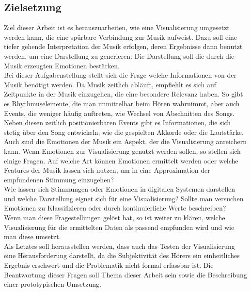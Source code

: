 \documentclass[11pt,a4paper]{article}
\begin{document}
\subsection{Zielsetzung}
Ziel dieser Arbeit ist es herauszuarbeiten, wie eine Visualisierung umgesetzt werden kann, die eine spürbare Verbindung zur Musik aufweist. Dazu soll eine tiefer gehende Interpretation der Musik erfolgen, deren Ergebnisse dann benutzt werden, um eine Darstellung zu generieren. Die Darstellung soll die durch die Musik erzeugten Emotionen bestärken.\\
Bei dieser Aufgabenstellung stellt sich die Frage welche Informationen von der Musik benötigt werden. Da Musik zeitlich abläuft, empfiehlt es sich auf Zeitpunkte in der Musik einzugehen, die eine besondere Relevanz haben. So gibt es Rhythmuselemente, die man unmittelbar beim Hören wahrnimmt, aber auch Events, die weniger häufig auftreten, wie Wechsel von Abschnitten des Songs. Neben diesen zeitlich positionierbaren Events gibt es Informationen, die sich stetig über den Song entwickeln, wie die gespielten Akkorde oder die Lautstärke.\\
Auch sind die Emotionen der Musik ein Aspekt, der die Visualisierung anreichern kann.
Wenn Emotionen zur Visualisierung genutzt werden sollen, so stellen sich einige Fragen. Auf welche Art können Emotionen ermittelt werden oder welche Features der Musik lassen sich nutzen, um in eine Approximation der empfundenen Stimmung einzugehen?\\
Wie lassen sich Stimmungen oder Emotionen in digitalen Systemen darstellen und welche Darstellung eignet sich für eine Visualisierung? Sollte man versuchen Emotionen zu Klassifizieren oder durch kontinuierliche Werte beschreiben?\\
Wenn man diese Fragestellungen gelöst hat, so ist weiter zu klären, welche Visualisierung für die ermittelten Daten als passend empfunden wird und wie man diese umsetzt.\\
Als Letztes soll herausstellen werden, dass auch das Testen der Visualisierung eine Herausforderung darstellt, da die Subjektivität des Hörers ein einheitliches Ergebnis erschwert und die Problematik nicht formal erfassbar ist. Die Beantwortung dieser Fragen soll Thema dieser Arbeit sein sowie die Beschreibung einer prototypischen Umsetzung.
\end{document}
